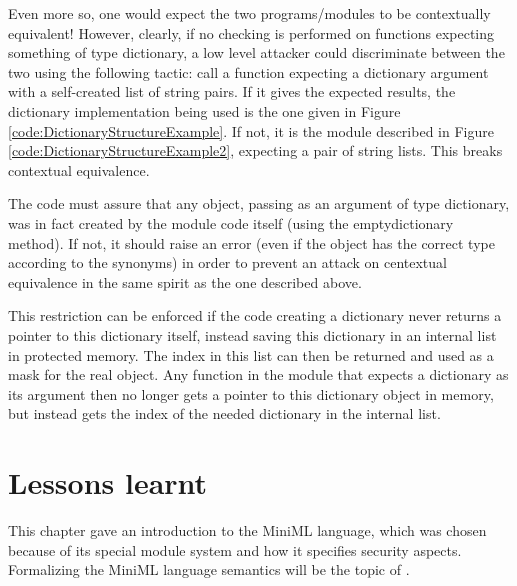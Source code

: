 \documentclass[10pt,a4paper]{report}
\begin{document}
Even more so, one would expect the two programs/modules to be contextually equivalent! However, clearly, if no checking is performed on functions expecting something of type dictionary, a low level attacker could discriminate between the two using the following tactic: call a function expecting a dictionary argument with a self-created list of string pairs. If it gives the expected results, the dictionary implementation being used is the one given in Figure \ref{code:DictionaryStructureExample}. If not, it is the module described in Figure \ref{code:DictionaryStructureExample2}, expecting a pair of string lists. This breaks contextual equivalence.

The code must assure that any object, passing as an argument of type dictionary, was in fact created by the module code itself (using the emptydictionary method). If not, it should raise an error (even if the object has the correct type according to the synonyms) in order to prevent an attack on centextual equivalence in the same spirit as the one described above.

This restriction can be enforced if the code creating a dictionary never returns a pointer to this dictionary itself, instead saving this dictionary in an internal list in protected memory. The index in this list can then be returned and used as a mask for the real object. Any function in the module that expects a dictionary as its argument then no longer gets a pointer to this dictionary object in memory, but instead gets the index of the needed dictionary in the internal list.


\section{Lessons learnt}

This chapter gave an introduction to the \mbox{MiniML} language, which was chosen because of its special module system and how it specifies security aspects. Formalizing the \mbox{MiniML} language semantics will be the topic of \label{chapter:formalspecification}.
\end{document}
